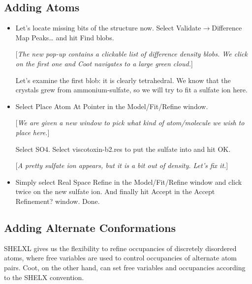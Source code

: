 \documentclass{article}
\begin{document}
\subsection{Adding Atoms}
\begin{itemize}
\item Let's locate missing bits of the structure now. Select \textsf{Validate$\to$Difference Map Peaks\ldots} and hit \textsf{Find blobs}.

[\textsl{The new pop-up contains a clickable list of difference density blobs. We click on the first one and Coot navigates to a large green cloud.}]

Let's examine the first blob: it is clearly tetrahedral. We know that the crystals grew from ammonium-sulfate, so we will try to fit a sulfate ion here.

\item Select \textsf{Place Atom At Pointer} in the \textsf{Model/Fit/Refine} window.

[\textsl{We are given a new window to pick what kind of atom/molecule we wish to place here.}]

Select \textsf{SO4}. Select viscotoxin-b2.res to put the sulfate into and hit \textsf{OK}.

[\textsl{A pretty sulfate ion appears, but it is a bit out of density. Let's fix it.}]

\item Simply select \textsf{Real Space Refine} in the \textsf{Model/Fit/Refine} window and click twice on the new sulfate ion. And finally hit \textsf{Accept} in the \textsf{Accept Refinement?} window. Done.


\end{itemize}

\subsection{Adding Alternate Conformations}
SHELXL gives us the flexibility to refine occupancies of discretely disordered atoms, where free variables are used to control occupancies of alternate atom pairs. Coot, on the other hand, can set free variables and occupancies according to the SHELX convention. 
\end{document}
